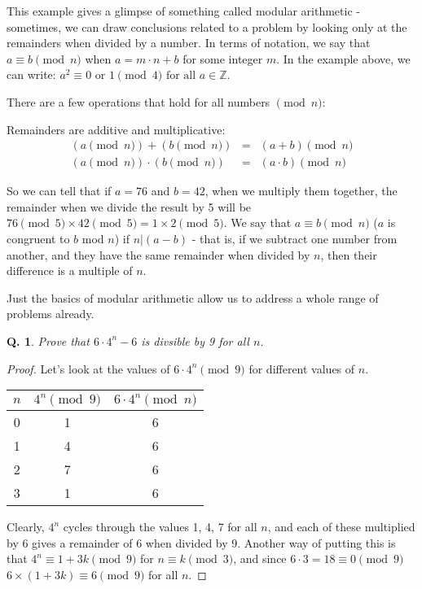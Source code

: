 \documentclass{article}
\newtheorem{question}{Q.}
\begin{document}
This example gives a glimpse of something called modular arithmetic - sometimes,
we can draw conclusions related to a problem by looking only at the remainders
when divided by a number. In terms of notation, we say that $a \equiv b \pmod{n}$
when $a = m\cdot n+b$ for some integer $m$. In the example above, we can write:
$a^2 \equiv 0 \text{ or } 1 \pmod{4} \text{ for all } a\in \mathbb{Z}$.

There are a few operations that hold for all numbers $\pmod{n}$:

Remainders are additive and multiplicative:
\begin{eqnarray*}
	(a\pmod{n}) + (b\pmod{n}) & = & (a+b)\pmod{n} \\
	(a\pmod{n}) \cdot (b\pmod{n}) & = & (a\cdot b) \pmod{n}
\end{eqnarray*}

So we can tell that if $a=76$ and $b=42$, when we multiply them together, the
remainder when we divide the result by 5 will be $76 \pmod{5} \times 42 \pmod{5}
= 1\times 2 \pmod{5}$. We say that $a \equiv b \pmod{n}$ ($a$ is congruent to $b$
mod $n$) if $n|(a-b)$ - that is, if we subtract one number from another, and they
have the same remainder when divided by $n$, then their difference is a multiple
of $n$.  

Just the basics of modular arithmetic allow us to address a whole range of problems already.

\begin{question}Prove that $6\cdot 4^n - 6$ is divsible by 9 for all $n$.\end{question}
\begin{proof}
	Let's look at the values of $6 \cdot 4^n \pmod{9}$ for different
values of $n$. 

\begin{table}[htb]
\begin{tabular}{|c|c|c|}
\hline
	$n$ & $4^n \pmod{9}$ & $6\cdot 4^n \pmod{n}$\\   
\hline 
	0 & 1 & 6 \\
	1 & 4 & 6 \\
	2 & 7 & 6 \\
	3 & 1 & 6 \\
\hline 
\end{tabular}
\end{table}

Clearly, $4^n$ cycles through the values 1, 4, 7 for all $n$, and each of these multiplied
by $6$ gives a remainder of 6 when divided by 9. Another way of putting this is that
$4^n \equiv 1 +3k \pmod{9}$ for $n\equiv k \pmod{3}$, and since $6\cdot 3 = 18 \equiv 0 \pmod{9}$
$6\times (1+3k) \equiv 6 \pmod{9}$ for all $n$.
\end{proof}
\end{document}
